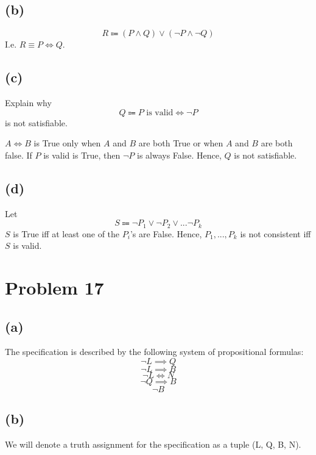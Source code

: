 \documentclass{article}
\begin{document}
\subsection{(b)}
\[
	R \Coloneqq (P \land Q) \lor (\neg P \land \neg Q)
\]
I.e. $R \equiv P \iff Q$.

\subsection{(c)}
Explain why
\[
	Q \Coloneqq P \text{ is valid} \iff \neg P
\]
is not satisfiable.

$A \iff B$ is True only when $A$ and $B$ are both True or when $A$ and $B$ are both false. If $P$ is valid is True, then $\neg P$ is always False. Hence, $Q$ is not satisfiable.

\subsection{(d)}
Let
\[
	S \Coloneqq \neg P_1 \lor \neg P_2 \lor ... \neg P_k
\]
$S$ is True iff at least one of the $P_i$'s are False. Hence, $P_1, ..., P_k$ is not consistent iff $S$ is valid.

\pagebreak

\section{Problem 17}
\subsection{(a)}
The specification is described by the following system of propositional formulas:
\begin{equation}
	\label{p17e1}
	\neg L \implies Q
\end{equation}
\begin{equation}
	\label{p17e2}
	\neg L \implies B
\end{equation}
\begin{equation}
	\label{p17e3}
	\neg L \iff N
\end{equation}
\begin{equation}
	\label{p17e4}
	\neg Q \implies B
\end{equation}
\begin{equation}
	\label{p17e5}
	\neg B
\end{equation}
\subsection{(b)}
We will denote a truth assignment for the specification as a tuple (L, Q, B, N).
\end{document}
